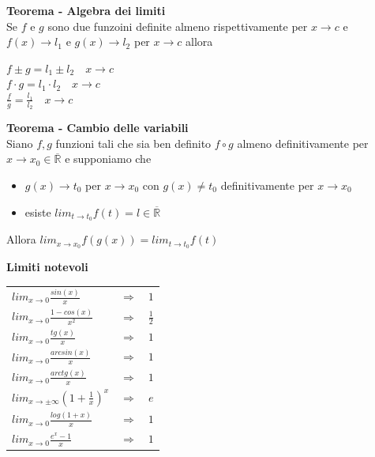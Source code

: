 \documentclass[12pt, a4paper]{article}
\begin{document}
    \textbf{Teorema - Algebra dei limiti}\\Se $f$ e $g$ sono due funzoini definite almeno rispettivamente per $x\to c$
    e $f(x)\to l_{1}$ e $g(x)\to l_{2}$ per $x\to c$ allora
    \begin{center}
        $f\pm g=l_{1}\pm l_{2}\quad x\to c$\\
        $f\cdot g=l_{1}\cdot l_{2}\quad x\to c$\\
        $\frac{f}{g}=\frac{l_{1}}{l_{2}}\quad x\to c$
    \end{center}

    \textbf{Teorema - Cambio delle variabili}\\Siano $f,g$ funzioni tali che sia ben definito $f\circ g$ almeno
    definitivamente per $x\to x_{0}\in\overline{\mathbb{R}}$ e supponiamo che
    \begin{itemize}
        \item $g(x)\to t_{0}$ per $x\to x_{0}$ con $g(x)\neq t_{0}$ definitivamente per $x\to x_{0}$
        \item esiste $lim_{t\to t_{0}}f(t)=l\in\overline{\mathbb{R}}$
    \end{itemize}
    Allora $lim_{x\to x_{0}}f(g(x))= lim_{t\to t_{0}}f(t)$

    \textbf{Limiti notevoli}
    \begin{center}
        \begin{tabular}{l c c}
            $lim_{x\to 0}\frac{sin(x)}{x}$           & $\Rightarrow$ & $1$           \\
            $lim_{x\to 0}\frac{1-cos(x)}{x^{2}}$     & $\Rightarrow$ & $\frac{1}{2}$ \\
            $lim_{x\to 0}\frac{tg(x)}{x}$            & $\Rightarrow$ & $1$           \\
            $lim_{x\to 0}\frac{arcsin(x)}{x}$        & $\Rightarrow$ & $1$           \\
            $lim_{x\to 0}\frac{arctg(x)}{x}$         & $\Rightarrow$ & $1$           \\
            $lim_{x\to\pm\infty}(1+\frac{1}{x})^{x}$ & $\Rightarrow$ & $e$           \\
            $lim_{x\to 0}\frac{log(1+x)}{x}$         & $\Rightarrow$ & $1$           \\
            $lim_{x\to 0}\frac{e^{x}-1}{x}$          & $\Rightarrow$ & $1$           \\
        \end{tabular}
    \end{center}
\end{document}
